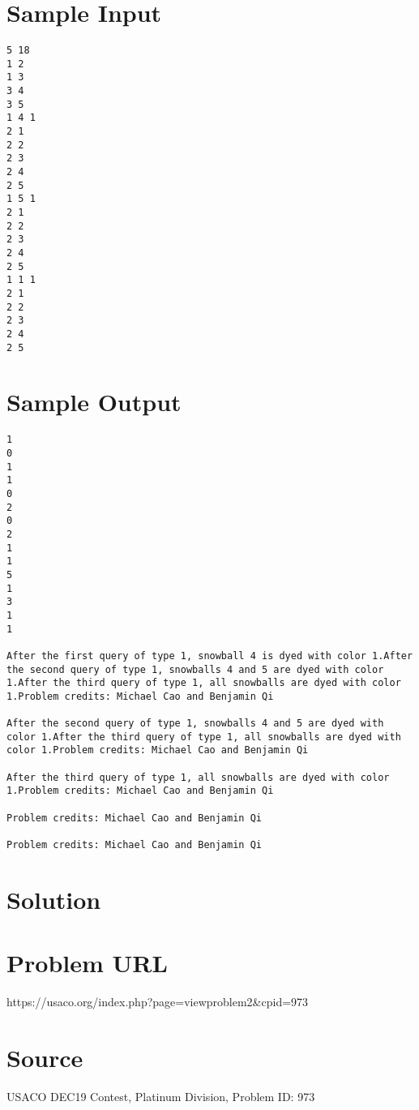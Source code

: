 \documentclass[12pt]{article}
\begin{document}
\section*{Sample Input}
\begin{verbatim}
5 18
1 2
1 3
3 4
3 5
1 4 1
2 1
2 2
2 3
2 4
2 5
1 5 1
2 1
2 2
2 3
2 4
2 5
1 1 1
2 1
2 2
2 3
2 4
2 5
\end{verbatim}

\section*{Sample Output}
\begin{verbatim}
1
0
1
1
0
2
0
2
1
1
5
1
3
1
1

After the first query of type 1, snowball 4 is dyed with color 1.After the second query of type 1, snowballs 4 and 5 are dyed with color 1.After the third query of type 1, all snowballs are dyed with color 1.Problem credits: Michael Cao and Benjamin Qi

After the second query of type 1, snowballs 4 and 5 are dyed with color 1.After the third query of type 1, all snowballs are dyed with color 1.Problem credits: Michael Cao and Benjamin Qi

After the third query of type 1, all snowballs are dyed with color 1.Problem credits: Michael Cao and Benjamin Qi

Problem credits: Michael Cao and Benjamin Qi

Problem credits: Michael Cao and Benjamin Qi
\end{verbatim}

\section*{Solution}


\section*{Problem URL}
https://usaco.org/index.php?page=viewproblem2&cpid=973

\section*{Source}
USACO DEC19 Contest, Platinum Division, Problem ID: 973
\end{document}
